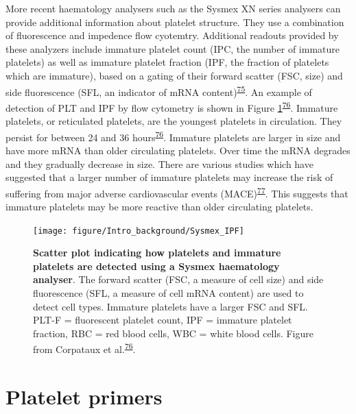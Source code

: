 \documentclass[11pt,twoside]{bristolthesis}
\begin{document}
More recent haematology analysers such as the Sysmex XN series analysers can provide additional information about platelet structure. They use a combination of fluorescence and impedence flow cyotemtry. Additional readouts provided by these analyzers include immature platelet count (IPC, the number of immature platelets) as well as immature platelet fraction (IPF, the fraction of platelets which are immature), based on a gating of their forward scatter (FSC, size) and side fluorescence (SFL, an indicator of mRNA content)\textsuperscript{\protect\hyperlink{ref-UnayDemirel2018a}{75}}. An example of detection of PLT and IPF by flow cytometry is shown in Figure \ref{fig:sysmex-ipf}\textsuperscript{\protect\hyperlink{ref-Corpataux2020}{76}}. Immature platelets, or reticulated platelets, are the youngest platelets in circulation. They persist for between 24 and 36 hours\textsuperscript{\protect\hyperlink{ref-Corpataux2020}{76}}. Immature platelets are larger in size and have more mRNA than older circulating platelets. Over time the mRNA degrades and they gradually decrease in size. There are various studies which have suggested that a larger number of immature platelets may increase the risk of suffering from major adverse cardiovascular events (MACE)\textsuperscript{\protect\hyperlink{ref-Ibrahim2014}{77}}. This suggests that immature platelets may be more reactive than older circulating platelets.




\begin{figure}

{\centering \texttt{[image: figure/Intro\_background/Sysmex\_IPF]} 

}

\caption[Scatter plot indicating how platelets are immature platelets are detected using a Sysmex haematology analyser]{\textbf{Scatter plot indicating how platelets and immature platelets are detected using a Sysmex haematology analyser}. The forward scatter (FSC, a measure of cell size) and side fluorescence (SFL, a measure of cell mRNA content) are used to detect cell types. Immature platelets have a larger FSC and SFL. PLT-F = fluorescent platelet count, IPF = immature platelet fraction, RBC = red blood cells, WBC = white blood cells. Figure from Corpataux et al.\textsuperscript{\protect\hyperlink{ref-Corpataux2020}{76}}.}\label{fig:sysmex-ipf}
\end{figure}
\hypertarget{platelet-primers}{%
\section{Platelet primers}\label{platelet-primers}}
\end{document}
